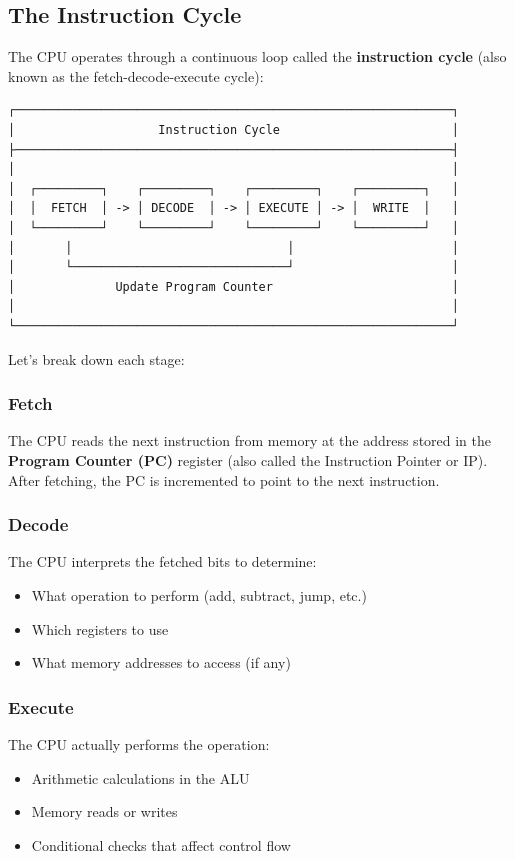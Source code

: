 \subsection{The Instruction Cycle}

The CPU operates through a continuous loop called the \textbf{instruction cycle} (also known as the fetch-decode-execute cycle):

\begin{verbatim}
┌─────────────────────────────────────────────────────────────┐
│                    Instruction Cycle                        │
├─────────────────────────────────────────────────────────────┤
│                                                             │
│  ┌─────────┐    ┌─────────┐    ┌─────────┐    ┌─────────┐   │
│  │  FETCH  │ -> │ DECODE  │ -> │ EXECUTE │ -> │  WRITE  │   │
│  └─────────┘    └─────────┘    └─────────┘    └─────────┘   │
│       │                              │                      │
│       └──────────────────────────────┘                      │
│              Update Program Counter                         │
│                                                             │
└─────────────────────────────────────────────────────────────┘
\end{verbatim}

Let's break down each stage:

\subsubsection{Fetch}
The CPU reads the next instruction from memory at the address stored in the \textbf{Program Counter (PC)} register (also called the Instruction Pointer or IP). After fetching, the PC is incremented to point to the next instruction.

\subsubsection{Decode}
The CPU interprets the fetched bits to determine:
\begin{itemize}
  \item What operation to perform (add, subtract, jump, etc.)
  \item Which registers to use
  \item What memory addresses to access (if any)
\end{itemize}

\subsubsection{Execute}
The CPU actually performs the operation:
\begin{itemize}
  \item Arithmetic calculations in the ALU
  \item Memory reads or writes
  \item Conditional checks that affect control flow
\end{itemize}

